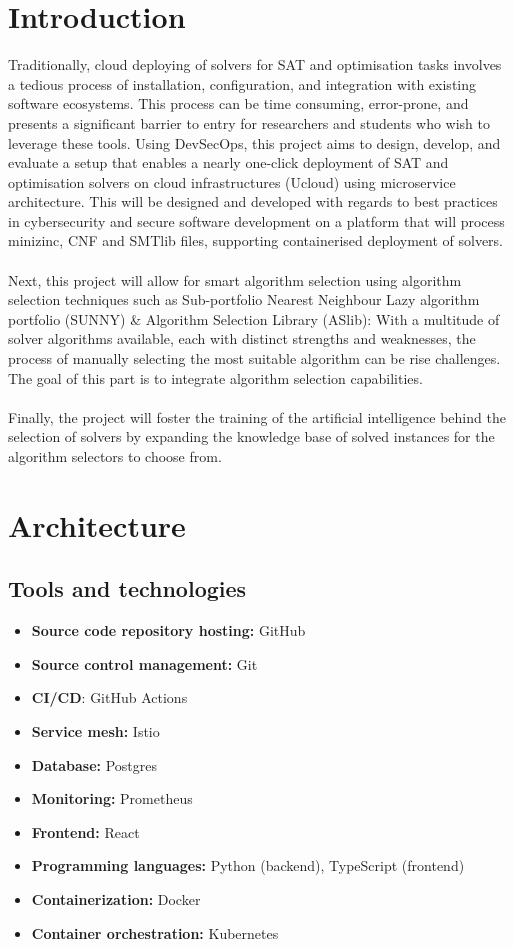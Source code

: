 \documentclass[12pt]{article}
\begin{document}
\newpage
{}

\section{Introduction}
Traditionally, cloud deploying of solvers for SAT and optimisation tasks involves a tedious process of installation, configuration, and integration with existing software ecosystems.  This process can be time consuming, error-prone, and presents a significant barrier to entry for researchers and students who wish to leverage these tools.  Using DevSecOps, this project aims to design, develop, and evaluate a setup that enables a nearly one-click deployment of SAT and optimisation solvers on cloud infrastructures (Ucloud) using microservice architecture.  This will be designed and developed with regards to best practices in cybersecurity and secure software development on a platform that will process minizinc, CNF and SMTlib files, supporting containerised deployment of solvers.\\
\\
Next,  this  project  will  allow  for  smart  algorithm  selection  using  algorithm  selection  techniques such as Sub-portfolio Nearest Neighbour Lazy algorithm portfolio (SUNNY) \& Algorithm Selection Library (ASlib):  With a multitude of solver algorithms available, each with distinct strengths and weaknesses,  the process of manually selecting the most suitable algorithm can be rise challenges. The goal of this part is to integrate algorithm selection capabilities.\\
\\
Finally, the project will foster the training of the artificial intelligence behind the selection of solvers by expanding the knowledge base of solved instances for the algorithm selectors to choose from.
\section{Architecture}
\subsection{Tools and technologies}
\begin{itemize}
    \item \textbf{Source code repository hosting:} GitHub
    \item \textbf{Source control management:} Git
    \item \textbf{CI/CD}: GitHub Actions
    \item \textbf{Service mesh:} Istio
    \item \textbf{Database:} Postgres
    \item \textbf{Monitoring:} Prometheus
    \item \textbf{Frontend:} React
    \item \textbf{Programming languages:} Python (backend), TypeScript (frontend)
    \item \textbf{Containerization:} Docker
    \item \textbf{Container orchestration:} Kubernetes
    
\end{itemize}
\newpage
\end{document}
